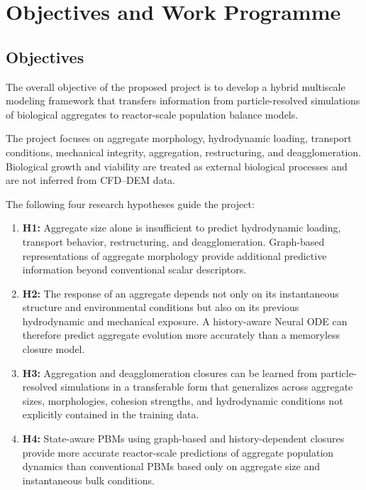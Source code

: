 \documentclass[11pt,a4paper,twoside]{scrartcl}
\begin{document}
\section{Objectives and Work Programme}

\subsection{Objectives}

The overall objective of the proposed project is to develop a hybrid multiscale modeling framework that transfers information from particle-resolved simulations of biological aggregates to reactor-scale population balance models.

The project focuses on aggregate morphology, hydrodynamic loading, transport conditions, mechanical integrity, aggregation, restructuring, and deagglomeration. Biological growth and viability are treated as external biological processes and are not inferred from CFD--DEM data.

The following four research hypotheses guide the project:

\begin{enumerate}
	
	\item \textbf{H1:} Aggregate size alone is insufficient to predict hydrodynamic loading, transport behavior, restructuring, and deagglomeration. Graph-based representations of aggregate morphology provide additional predictive information beyond conventional scalar descriptors.
	
	\item \textbf{H2:} The response of an aggregate depends not only on its instantaneous structure and environmental conditions but also on its previous hydrodynamic and mechanical exposure. A history-aware Neural ODE can therefore predict aggregate evolution more accurately than a memoryless closure model.
	
	\item \textbf{H3:} Aggregation and deagglomeration closures can be learned from particle-resolved simulations in a transferable form that generalizes across aggregate sizes, morphologies, cohesion strengths, and hydrodynamic conditions not explicitly contained in the training data.
	
	\item \textbf{H4:} State-aware PBMs using graph-based and history-dependent closures provide more accurate reactor-scale predictions of aggregate population dynamics than conventional PBMs based only on aggregate size and instantaneous bulk conditions.
	
\end{enumerate}
\end{document}
